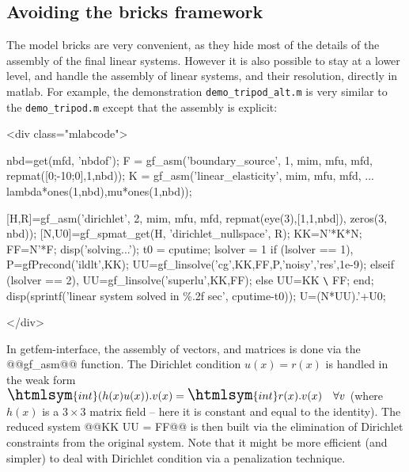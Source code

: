 \documentclass[11pt,a4paper]{article}
\newcommand{\sf}[1]{#1}
\newcommand{\int}{{\Large\htmlsym{int}}}
\newenvironment{mcode}{\begin{rawxml}<div class="mlabcode">\end{rawxml}\begin{example}}{\end{example}\begin{rawxml}</div>\end{rawxml}}
\newenvironment{mcode}{\begin{alltt}}{\end{alltt}}
\newcommand{\mlab}{{\sf matlab}\xspace}
\newcommand{\gfi}{{\sf getfem-interface}\xspace}
\begin{document}
\subsection{Avoiding the bricks framework}

The model bricks are very convenient, as they hide most of the details
of the assembly of the final linear systems. However it is also
possible to stay at a lower level, and handle the assembly of linear
systems, and their resolution, directly in \mlab. For example, the
demonstration \texttt{demo\_tripod\_alt.m} is very similar to the
\texttt{demo\_tripod.m} except that the assembly is explicit:

\begin{mcode}
nbd=get(mfd, 'nbdof');
F = gf_asm('boundary_source', 1, mim, mfu, mfd, repmat([0;-10;0],1,nbd));
K = gf_asm('linear_elasticity', mim, mfu, mfd, ...
	   lambda*ones(1,nbd),mu*ones(1,nbd));

[H,R]=gf_asm('dirichlet', 2, mim, mfu, mfd, repmat(eye(3),[1,1,nbd]), zeros(3, nbd));
[N,U0]=gf_spmat_get(H, 'dirichlet_nullspace', R);
KK=N'*K*N;
FF=N'*F;
disp('solving...'); t0 = cputime;
lsolver = 1 %
if (lsolver == 1),     %
  P=gfPrecond('ildlt',KK);
  UU=gf_linsolve('cg',KK,FF,P,'noisy','res',1e-9);
elseif (lsolver == 2), %
  UU=gf_linsolve('superlu',KK,FF);
else                   %
  UU=KK \verb+\+ FF;
end;
disp(sprintf('linear system solved in \%.2f sec', cputime-t0));
U=(N*UU).'+U0;
\end{mcode}

In \gfi, the assembly of vectors, and matrices is done via the
@@gf\_asm@@ function. The Dirichlet condition $u(x) = r(x)$ is handled
in the weak form $\int (h(x)u(x)).v(x) = \int r(x).v(x)\quad \forall v$ (where
$h(x)$ is a $3\times3$ matrix field -- here it is constant and equal to the
identity). The reduced system @@KK UU = FF@@ is then built via the
elimination of Dirichlet constraints from the original system. Note
that it might be more efficient (and simpler) to deal with Dirichlet
condition via a penalization technique.
\end{document}
